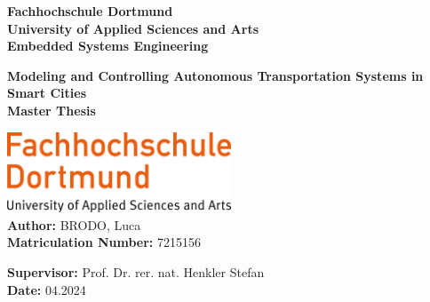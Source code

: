 

\begin{titlepage}
    \centering
    \vspace*{0.5cm}
    \Large
    \textbf{Fachhochschule Dortmund} \\
    \textbf{University of Applied Sciences and Arts} \\
    \textbf{Embedded Systems Engineering}\\
	\centering
	

    \vspace{2cm}

    \LARGE
    \textbf{Modeling and Controlling Autonomous Transportation Systems in Smart Cities} \\
     \vspace{1cm}
    \textbf{Master Thesis}



   
    \vspace{3cm}
	
	
    \includegraphics[width=0.5\textwidth]{assets/img/01_title/FH_Dortmund-logo.svg.png}\\ 
    \vspace{1cm}
    \large
	\textbf{Author:} \hspace{0.5cm} BRODO, Luca\\
	\textbf{Matriculation Number:} \hspace{0.5cm} 7215156
	    
   

    \textbf{Supervisor:} \hspace{0.5cm} Prof. Dr. rer. nat. Henkler Stefan \\
    \textbf{Date:} \hspace{0.5cm} 04.2024

    \vfill
    \vspace{1cm}

\end{titlepage}

